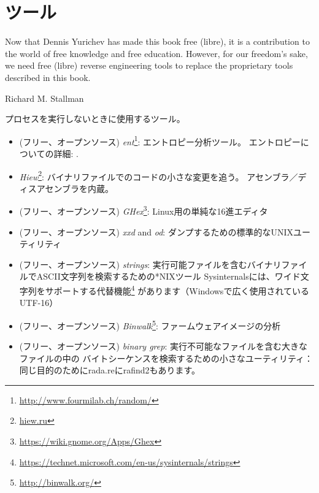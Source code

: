 \chapter{ツール}

\epigraph{Now that Dennis Yurichev has made this book free (libre), it is a
contribution to the world of free knowledge and free education.
However, for our freedom's sake, we need free (libre) reverse
engineering tools to replace the proprietary tools described in this book.}{Richard M. Stallman}


プロセスを実行しないときに使用するツール。


\begin{itemize}
\item
(フリー、オープンソース) \emph{ent}\footnote{\url{http://www.fourmilab.ch/random/}}: エントロピー分析ツール。
エントロピーについての詳細: .

\item
\label{Hiew}
\emph{Hiew}\footnote{\href{http://www.hiew.ru/}{hiew.ru}}:
バイナリファイルでのコードの小さな変更を追う。
アセンブラ／ディスアセンブラを内蔵。

\item (フリー、オープンソース) \emph{GHex}\footnote{\url{https://wiki.gnome.org/Apps/Ghex}}: Linux用の単純な16進エディタ

\item (フリー、オープンソース) \emph{xxd} and \emph{od}: ダンプするための標準的なUNIXユーティリティ

\item (フリー、オープンソース) \emph{strings}: 実行可能ファイルを含むバイナリファイルでASCII文字列を検索するための*NIXツール
Sysinternalsには、ワイド文字列をサポートする代替機能\footnote{\url{https://technet.microsoft.com/en-us/sysinternals/strings}}
があります（Windowsで広く使用されているUTF-16）

\item (フリー、オープンソース) \emph{Binwalk}\footnote{\url{http://binwalk.org/}}: ファームウェアイメージの分析

\item
{}
(フリー、オープンソース) \emph{binary grep}:
実行不可能なファイルを含む大きなファイルの中の
バイトシーケンスを検索するための小さなユーティリティ：\BGREPURL
{}
同じ目的のためにrada.reにrafind2もあります。
\end{itemize}


